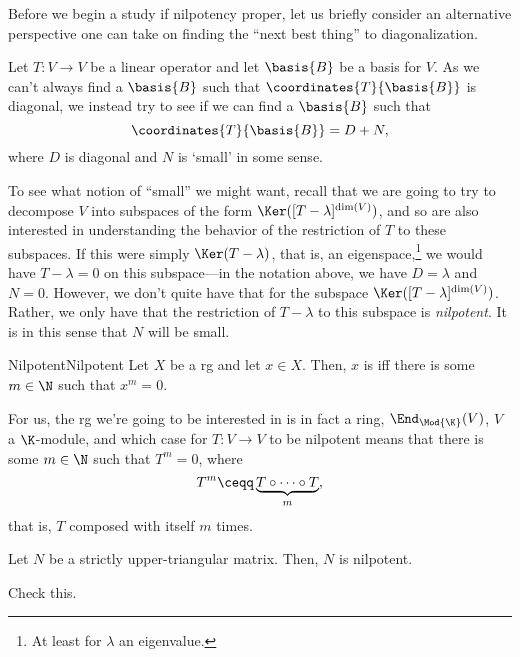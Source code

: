 Before we begin a study if nilpotency proper, let us briefly consider an alternative perspective one can take on finding the ``next best thing'' to diagonalization.

Let $T\colon V\rightarrow V$ be a linear operator and let $\basis{B}$ be a basis for $V$.  As we can't always find a $\basis{B}$ such that $\coordinates{T}{\basis{B}}$ is diagonal, we instead try to see if we can find a $\basis{B}$ such that
\begin{equation}
	\coordinates{T}{\basis{B}}=D+N,
\end{equation}
where $D$ is diagonal and $N$ is `small' in some sense.

To see what notion of ``small'' we might want, recall that we are going to try to decompose $V$ into subspaces of the form $\Ker ([T-\lambda ]^{\dim (V)})$, and so are also interested in understanding the behavior of the restriction of $T$ to these subspaces.  If this were simply $\Ker (T-\lambda )$, that is, an eigenspace,\footnote{At least for $\lambda$ an eigenvalue.} we would have $T-\lambda =0$ on this subspace---in the notation above, we have $D=\lambda$ and $N=0$.  However, we don't quite have that for the subspace $\Ker ([T-\lambda ]^{\dim (V)})$.  Rather, we only have that the restriction of $T-\lambda$ to this subspace is \emph{nilpotent}.  It is in this sense that $N$ will be small.
\begin{dfn}{Nilpotent}{Nilpotent}
	Let $X$ be a rg and let $x\in X$.  Then, $x$ is  iff there is some $m\in \N$ such that $x^m=0$.
	\begin{rmk}
		For us, the rg we're going to be interested in is in fact a ring, $\End _{\Mod{\K}}(V)$, $V$ a $\K$-module, and which case for $T\colon V\rightarrow V$ to be nilpotent means that there is some $m\in \N$ such that $T^m=0$, where
		\begin{equation}
			T^m\ceqq \underbrace{T\circ \cdots \circ T}_m,
		\end{equation}
		that is, $T$ composed with itself $m$ times.
	\end{rmk}
\end{dfn}
\begin{exm}{}{}
	Let $N$ be a strictly upper-triangular matrix.  Then, $N$ is nilpotent.
	\begin{exr}[breakable=false]{}{}
		Check this.
	\end{exr}
\end{exm}

